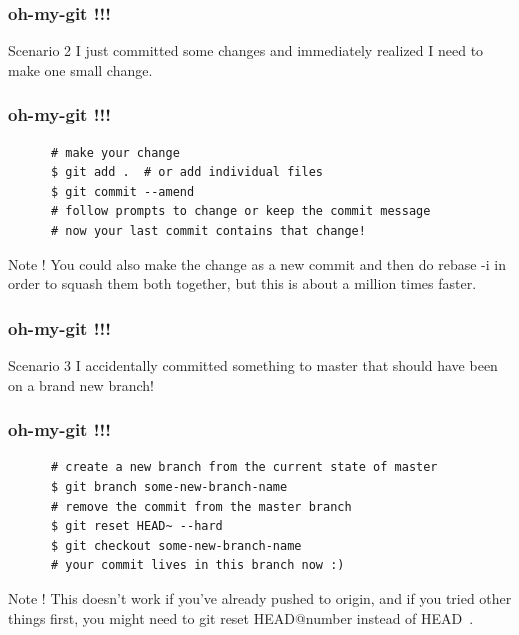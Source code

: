 \documentclass[10pt]{beamer}
\begin{document}
\begin{frame}
  \frametitle{oh-my-git !!!}
  \begin{alertblock}{Scenario 2}
    I just committed some changes and immediately realized I need to make one small change.
  \end{alertblock}
\end{frame}

\begin{frame}[fragile]
  \frametitle{oh-my-git !!!}
  \begin{example}[Solution]
    \begin{verbatim}
      # make your change
      $ git add .  # or add individual files
      $ git commit --amend
      # follow prompts to change or keep the commit message
      # now your last commit contains that change!
    \end{verbatim}
  \end{example}
  \pause
  \begin{block}{Note !}
    You could also make the change as a new commit and then do rebase -i in order to squash them both together,
    but this is about a million times faster.
  \end{block}
\end{frame}

\begin{frame}
  \frametitle{oh-my-git !!!}
  \begin{alertblock}{Scenario 3}
   I accidentally committed something to master that should have been on a brand new branch!
  \end{alertblock}
\end{frame}

\begin{frame}[fragile]
  \frametitle{oh-my-git !!!}
  \begin{example}[Solution]
    \begin{verbatim}
      # create a new branch from the current state of master
      $ git branch some-new-branch-name
      # remove the commit from the master branch
      $ git reset HEAD~ --hard
      $ git checkout some-new-branch-name
      # your commit lives in this branch now :)
    \end{verbatim}
  \end{example}
  \pause
  \begin{block}{Note !}
    This doesn't work if you've already pushed to origin, and if you tried other things first,
    you might need to git reset HEAD@{number} instead of HEAD~.
  \end{block}
\end{frame}
\end{document}
